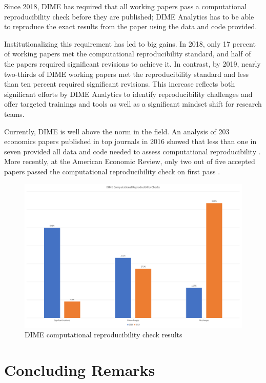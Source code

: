 Since 2018, DIME has required that all working papers pass a computational reproducibility check before they are published; DIME Analytics has to be able to reproduce the exact results from the paper using the data and code provided.

Institutionalizing this requirement has led to big gains. In 2018, only 17 percent of working papers met the computational reproducibility standard, and half of the papers required significant revisions to achieve it. In contrast, by 2019, nearly two-thirds of DIME working papers met the reproducibility standard and less than ten percent required significant revisions. This increase reflects both significant efforts by DIME Analytics to identify reproducibility challenges and offer targeted trainings and tools as well as a significant mindset shift for research teams. 

Currently, DIME is well above the norm in the field. An analysis of 203 economics papers published in top journals in 2016 showed that less than one in seven provided all data and code needed to assess computational reproducibility \citep{galiani2017}. More recently, at the American Economic Review, only two out of five accepted papers passed the computational reproducibility check on first pass \citep{vilhuber2019}.

\begin{figure}
\includegraphics[width=1\linewidth]{./figures/dimefigure6} \caption{DIME computational reproducibility check results}\label{fig:dimefigure6}
\end{figure}

\hypertarget{concluding-remarks-3}{%
\section{Concluding Remarks}\label{concluding-remarks-3}}

